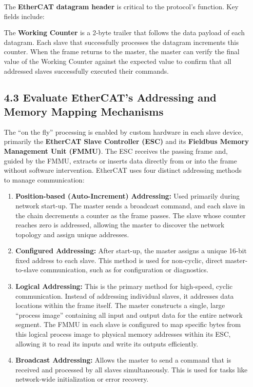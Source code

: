 \documentclass[a4paper, 12pt]{book} %
\begin{document}
The \textbf{EtherCAT datagram header} is critical to the protocol's
function. Key fields include:

The \textbf{Working Counter} is a 2-byte trailer that follows the data
payload of each datagram. Each slave that successfully processes the
datagram increments this counter. When the frame returns to the master,
the master can verify the final value of the Working Counter against the
expected value to confirm that all addressed slaves successfully
executed their commands.

\subsection{4.3 Evaluate EtherCAT's Addressing and Memory Mapping
Mechanisms}\label{evaluate-ethercats-addressing-and-memory-mapping-mechanisms}

The ``on the fly'' processing is enabled by custom hardware in each
slave device, primarily the \textbf{EtherCAT Slave Controller (ESC)} and
its \textbf{Fieldbus Memory Management Unit (FMMU)}. The ESC receives
the passing frame and, guided by the FMMU, extracts or inserts data
directly from or into the frame without software intervention. EtherCAT
uses four distinct addressing methods to manage communication:

\begin{enumerate}
\def\labelenumi{\arabic{enumi}.}
\tightlist
\item
  \textbf{Position-based (Auto-Increment) Addressing:} Used primarily
  during network start-up. The master sends a broadcast command, and
  each slave in the chain decrements a counter as the frame passes. The
  slave whose counter reaches zero is addressed, allowing the master to
  discover the network topology and assign unique addresses.
\item
  \textbf{Configured Addressing:} After start-up, the master assigns a
  unique 16-bit fixed address to each slave. This method is used for
  non-cyclic, direct master-to-slave communication, such as for
  configuration or diagnostics.
\item
  \textbf{Logical Addressing:} This is the primary method for
  high-speed, cyclic communication. Instead of addressing individual
  slaves, it addresses data locations within the frame itself. The
  master constructs a single, large ``process image'' containing all
  input and output data for the entire network segment. The FMMU in each
  slave is configured to map specific bytes from this logical process
  image to physical memory addresses within its ESC, allowing it to read
  its inputs and write its outputs efficiently.
\item
  \textbf{Broadcast Addressing:} Allows the master to send a command
  that is received and processed by all slaves simultaneously. This is
  used for tasks like network-wide initialization or error recovery.
\end{enumerate}
\end{document}
